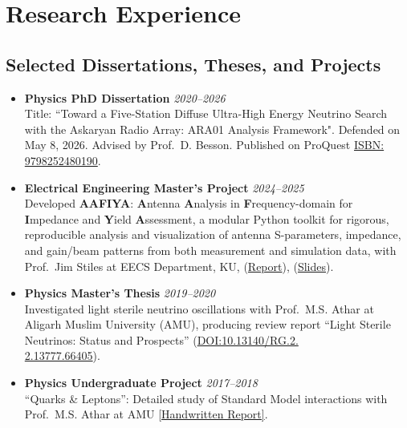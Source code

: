 \documentclass[10pt]{report}
\begin{document}
\section*{Research Experience}

\subsection*{Selected Dissertations, Theses, and Projects}
\begin{itemize}
    \item \textbf{Physics PhD Dissertation}  \textit{2020--2026} \\
    Title: ``Toward a Five-Station Diffuse Ultra-High Energy Neutrino Search with the Askaryan Radio Array: ARA01 Analysis Framework". Defended on May 8, 2026. Advised by Prof.\ D. Besson. Published on ProQuest \href{https://www.proquest.com/docview/3356640779/fulltextPDF/4CCB4101302F4FB5PQ}{ISBN: 9798252480190}.
    
    \item \textbf{Electrical Engineering Master's Project}  \textit{2024--2025} \\
     Developed \textbf{AAFIYA}: \textbf{A}ntenna \textbf{A}nalysis in \textbf{F}requency-domain for \textbf{I}mpedance and \textbf{Y}ield \textbf{A}ssessment, a modular Python toolkit for rigorous, reproducible analysis and visualization of antenna S-parameters, impedance, and gain/beam patterns from both measurement and simulation data, with Prof.\ Jim Stiles at EECS Department, KU, (\href{https://drive.google.com/file/d/16pZq9mp9qqmyMbJ__h_DtHzoyZJUpfUi/view?usp=share_link}{Report}), (\href{https://drive.google.com/file/d/1gTU03rgjUmX7zF2z2f57pjpDCmZjiHhI/view?usp=share_link}{Slides}).

     \item \textbf{Physics Master's Thesis}  \textit{2019--2020} \\
     Investigated light sterile neutrino oscillations with Prof.\ M.S. Athar at Aligarh Muslim University (AMU), producing review report ``Light Sterile Neutrinos: Status and Prospects'' (\href{https://www.researchgate.net/publication/354254795_LIGHT_STERILE_NEUTRINOS_OSCILLATION_STATUS_AND_PROSPECTS}{DOI:10.13140/RG.2.\\2.13777.66405}).

     \item \textbf{Physics Undergraduate Project}  \textit{2017--2018} \\
     ``Quarks \& Leptons'': Detailed study of Standard Model interactions with Prof.\ M.S. Athar at AMU \href{https://drive.google.com/file/d/11LsyY1QmncnjOGf1ZWpj7eTM-xcTbCNj/view?usp=sharing}{[Handwritten Report]}.

\end{itemize} 
\end{document}
